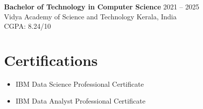 \documentclass[a4paper,11pt]{article}
\newcommand{\resumeItem}[1]{
    \item #1
}
\begin{document}
\textbf{Bachelor of Technology in Computer Science}
\hfill 2021 -- 2025 \\[2pt]
Vidya Academy of Science and Technology
\hfill Kerala, India \\[2pt]
CGPA: 8.24/10


\section*{Certifications}
\vspace{0.04cm}
\begin{itemize}
    \resumeItem{IBM Data Science Professional Certificate}
    \resumeItem{IBM Data Analyst Professional Certificate}
\end{itemize}
\end{document}
